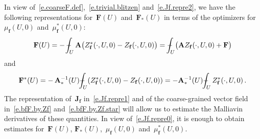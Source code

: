 \documentclass[11pt]{article} %
\numberwithin{equation}{section}
\theoremstyle{definition}
\newcommand{\f}{\mathbf{f}}
\def\Xint#1{\mathchoice
{\XXint\displaystyle\textstyle{#1}}%
{\XXint\textstyle\scriptstyle{#1}}%
{\XXint\scriptstyle\scriptscriptstyle{#1}}%
{\XXint\scriptscriptstyle\scriptscriptstyle{#1}}%
\!\int}
\def\XXint#1#2#3{{\setbox0=\hbox{$#1{#2#3}{\int}$}
\vcenter{\hbox{$#2#3$}}\kern-.5\wd0}}
\def\fint{\Xint-}
\newcommand{\bfA}{\mathbf{A}}
\newcommand{\bfJ}{\mathbf{J}}
\newcommand{\bfF}{\mathbf{F}}
\begin{document}
In view of~\eqref{e.coarseF.def},~\eqref{e.trivial.blitzen} and~\eqref{e.Jf.repre2}, we have the following representations for~$\bfF(U)$ and~$\bfF_*(U)$ in terms of the optimizers for~$\mu_\f(U,0)$ and~$\mu_\f^*(U,0)$: 
\begin{equation}
\label{e.bfF.by.Zf}
\bfF(U) 
=
-\,
\fint_{U}  \bfA \bigl( Z_\f^*(\cdot,U,0) - Z_\f(\cdot,U,0) \bigr) 
= 
\fint_{U} \bigl( \bfA  Z_\f(\cdot,U,0) +  \bfF\bigr) 
\end{equation}
and
\begin{equation}
\label{e.bfF.by.Zf.star}
\bfF^*(U) 
=
-\,
\bfA_{*}^{-1}(U) \fint_{U} ( Z_\f^*(\cdot,U,0) - Z_\f(\cdot,U,0)) = - \bfA_{*}^{-1}(U)  \fint_{U} Z_\f^*(\cdot,U,0) 
\,.
\end{equation}
The representation of~$\bfJ_\f$ in~\eqref{e.Jf.repre1} and of the coarse-grained vector field in~\eqref{e.bfF.by.Zf} and~\eqref{e.bfF.by.Zf.star} will allow us to estimate the Malliavin derivatives of these quantities. In view of~\eqref{e.Jf.repre0}, it is enough to obtain estimates for~$\bfF(U)$, $\bfF_*(U)$,~$\mu_\f(U,0)$ and~$\mu_\f^*(U,0)$. 
\end{document}
